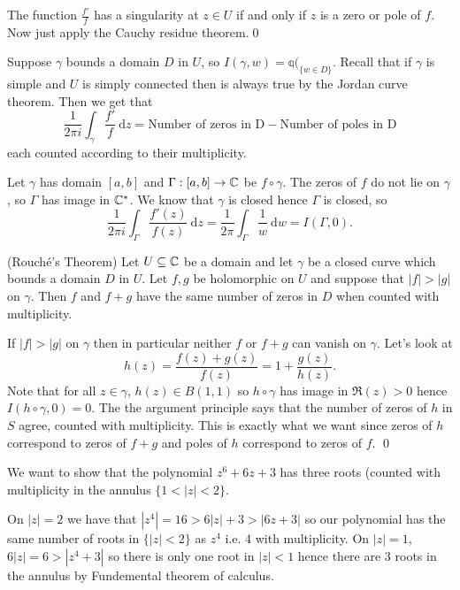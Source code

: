 \documentclass{article}
\begin{document}
\pf The function $ \frac{f'}{f} $ has a singularity at $ z\in U $ if and only if $ z $ is a zero or pole of $ f $. Now just apply the Cauchy residue theorem.\qed
\par
Suppose $ \gamma $ bounds a domain $ D $ in $ U $, so $ I(\gamma,w) = \mathbb q(_{\{w\in D\}} $. Recall that if $ \gamma $ is simple and $ U $ is simply connected then is always true by the Jordan curve theorem. Then we get that
\[
	\frac 1{2\pi i}\int_\gamma \frac{f'}{f} \ \mathrm dz = \text{Number of zeros in D} - \text{Number of poles in D}
\]
each counted according to their multiplicity.
\begin{remark}
	Let $ \gamma $ has domain $ [a,b] $ and $ \Gamma:[a,b]\to \mathbb{C} $ be $ f\circ \gamma $. The zeros of $ f $ do not lie on $ \gamma $, so $ \Gamma $ has image in $ \mathbb{C}^* $. We know that $ \gamma $ is closed hence $ \Gamma $ is closed, so
	\[
		\frac 1{2\pi i}\int_{\Gamma} \frac{f'(z)}{f(z)} \ \mathrm dz = \frac {1}{2\pi} \int_\Gamma \frac 1 w \ \mathrm dw = I(\Gamma,0).
	\]
\end{remark}
\begin{theorem}
	(Rouch\'e's Theorem) Let $ U\subseteq \mathbb{C} $ be a domain and let $ \gamma $ be a closed curve which bounds a domain $ D $ in $ U $. Let $ f,g $ be holomorphic on $ U $ and suppose that $ |f|>|g| $ on $ \gamma $. Then $ f $ and $ f+g $ have the same number of zeros in $ D $ when counted with multiplicity.
\end{theorem}
\pf If $ |f| > |g| $ on $ \gamma $ then in particular neither $ f $ or $ f+g $  can vanish on $ \gamma $. Let's look at
\[
	h(z) = \frac{f(z) +g(z)}{f(z)}= 1+ \frac{g(z)}{h(z)}.
\]
Note that for all $ z\in \gamma $, $ h(z) \in B(1,1) $ so $ h\circ \gamma $ has image in $ \Re(z)>0 $ hence $ I(h\circ \gamma, 0) = 0 $. The the argument principle says that the number of zeros of $ h $ in $ S $ agree, counted with multiplicity. This is exactly what we want since zeros of $ h $ correspond to zeros of $ f+g $ and poles of $ h $ correspond to zeros of $ f $. \qed
\begin{example}
	We want to show that the polynomial $ z^6 + 6z +3 $ has three roots (counted with multiplicity in the annulus $ \{1<|z|<2\} $.\par
	On $ |z|=2 $ we have that $ |z^4| = 16 > 6|z| + 3 > |6z+3| $ so our polynomial has the same number of roots in $ \{|z| < 2\} $ as $ z^4 $ i.e. $ 4 $ with multiplicity. On $ |z|=1 $, $ 6|z| = 6 > |z^4+3| $ so there is only one root in $ |z|<1 $ hence there are 3 roots in the annulus by Fundemental theorem of calculus.
\end{example}
\end{document}
